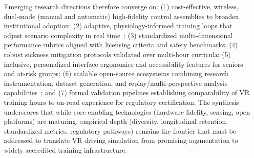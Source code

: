 Emerging research directions therefore converge on: (1) cost-effective, wireless, dual-mode (manual and automatic) high-fidelity control assemblies to broaden institutional adoption; (2) adaptive, physiology-informed training loops that adjust scenario complexity in real time~\cite{Abdurrahman2021}; (3) standardized multi-dimensional performance rubrics aligned with licensing criteria and safety benchmarks; (4) robust sickness mitigation protocols validated over multi-hour curricula; (5) inclusive, personalized interface ergonomics and accessibility features for seniors and at-risk groups; (6) scalable open-source ecosystems combining research instrumentation, dataset generation, and replay/multi-perspective analysis capabilities~\cite{Goedicke2022}; and (7) formal validation pipelines establishing comparability of VR training hours to on-road experience for regulatory certification. The synthesis underscores that while core enabling technologies (hardware fidelity, sensing, open platforms) are maturing, empirical depth (diversity, longitudinal retention, standardized metrics, regulatory pathways) remains the frontier that must be addressed to translate VR driving simulation from promising augmentation to widely accredited training infrastructure.


\vspace{6pt}

